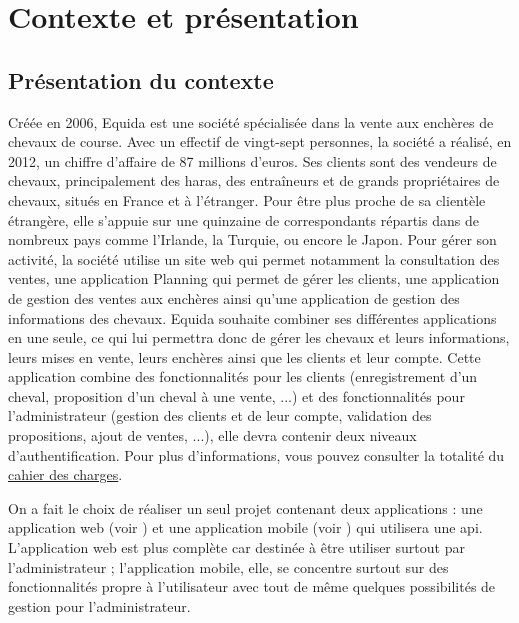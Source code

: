 \chapter{Contexte et présentation}
	\section{Présentation du contexte}

		Créée en 2006, Equida est une société spécialisée dans la vente aux enchères de chevaux de course. Avec un effectif de vingt-sept personnes, la société a réalisé, en 2012, un chiffre d’affaire de 87 millions d’euros. Ses clients sont des vendeurs de chevaux, principalement des haras, des entraîneurs et de grands propriétaires de chevaux, situés en France et à l’étranger. Pour être plus proche de sa clientèle étrangère, elle s’appuie sur une quinzaine de correspondants répartis dans de nombreux pays comme l’Irlande, la Turquie, ou encore le Japon.\newline
		Pour gérer son activité, la société utilise un site web qui permet notamment la consultation des ventes, une application Planning qui permet de gérer les clients, une application de gestion des ventes aux enchères ainsi qu'une application de gestion des informations des chevaux.\newline
		Equida souhaite combiner ses différentes applications en une seule, ce qui lui permettra donc de gérer les chevaux et leurs informations, leurs mises en vente, leurs enchères ainsi que les clients et leur compte.\newline
		Cette application combine des fonctionnalités pour les clients (enregistrement d'un cheval, proposition d'un cheval à une vente, ...) et des fonctionnalités pour l'administrateur (gestion des clients et de leur compte, validation des propositions, ajout de ventes, ...), elle devra contenir deux niveaux d'authentification.\newline
		Pour plus d'informations, vous pouvez consulter la totalité du \href{https://github.com/jmartin-pro/Equida/blob/master/doc/Cahier%20des%20charges.pdf}{cahier des charges}.

		\noindent
		On a fait le choix de réaliser un seul projet contenant deux applications : une application web (voir ) et une application mobile (voir ) qui utilisera une api. L'application web est plus complète car destinée à être utiliser surtout par l'administrateur ; l'application mobile, elle, se concentre surtout sur des fonctionnalités propre à l'utilisateur avec tout de même quelques possibilités de gestion pour l'administrateur.

